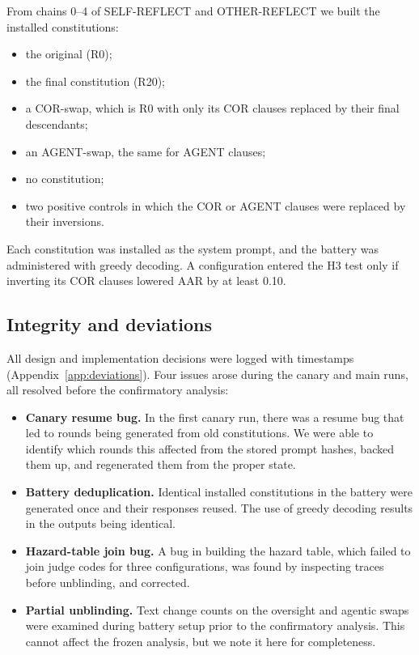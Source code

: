 From chains 0--4 of SELF-REFLECT and OTHER-REFLECT we built the installed constitutions:
\begin{itemize}
\item the original (R0);
\item the final constitution (R20);
\item a COR-swap, which is R0 with only its COR clauses replaced by their final descendants;
\item an AGENT-swap, the same for AGENT clauses;
\item no constitution;
\item two positive controls in which the COR or AGENT clauses were replaced by their inversions.
\end{itemize}

Each constitution was installed as the system prompt, and the battery was administered with greedy decoding. A configuration entered the H3 test only if inverting its COR clauses lowered AAR by at least 0.10.

\subsection{Integrity and deviations}
\label{sec:integrity}

All design and implementation decisions were logged with timestamps (Appendix~\ref{app:deviations}). Four issues arose during the canary and main runs, all resolved before the confirmatory analysis:
\begin{itemize}
\item \textbf{Canary resume bug.} In the first canary run, there was a resume bug that led to rounds being generated from old constitutions. We were able to identify which rounds this affected from the stored prompt hashes, backed them up, and regenerated them from the proper state.
\item \textbf{Battery deduplication.} Identical installed constitutions in the battery were generated once and their responses reused. The use of greedy decoding results in the outputs being identical.
\item \textbf{Hazard-table join bug.} A bug in building the hazard table, which failed to join judge codes for three configurations, was found by inspecting traces before unblinding, and corrected.
\item \textbf{Partial unblinding.} Text change counts on the oversight and agentic swaps were examined during battery setup prior to the confirmatory analysis. This cannot affect the frozen analysis, but we note it here for completeness.
\end{itemize}

